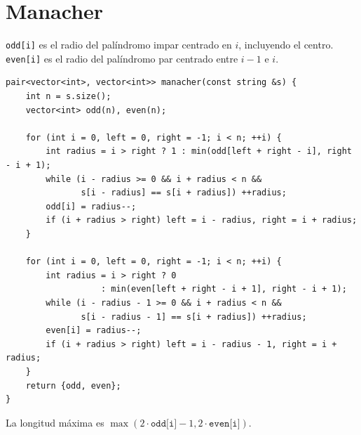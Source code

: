 \section{Manacher}

\texttt{odd[i]} es el radio del pal\'indromo impar centrado en $i$, incluyendo
el centro. \texttt{even[i]} es el radio del pal\'indromo par centrado entre
$i-1$ e $i$.


\begin{lstlisting}[style=cpp]
pair<vector<int>, vector<int>> manacher(const string &s) {
    int n = s.size();
    vector<int> odd(n), even(n);

    for (int i = 0, left = 0, right = -1; i < n; ++i) {
        int radius = i > right ? 1 : min(odd[left + right - i], right - i + 1);
        while (i - radius >= 0 && i + radius < n &&
               s[i - radius] == s[i + radius]) ++radius;
        odd[i] = radius--;
        if (i + radius > right) left = i - radius, right = i + radius;
    }

    for (int i = 0, left = 0, right = -1; i < n; ++i) {
        int radius = i > right ? 0
                   : min(even[left + right - i + 1], right - i + 1);
        while (i - radius - 1 >= 0 && i + radius < n &&
               s[i - radius - 1] == s[i + radius]) ++radius;
        even[i] = radius--;
        if (i + radius > right) left = i - radius - 1, right = i + radius;
    }
    return {odd, even};
}
\end{lstlisting}

La longitud m\'axima es
$\max(2\cdot\texttt{odd[i]}-1,2\cdot\texttt{even[i]})$.
